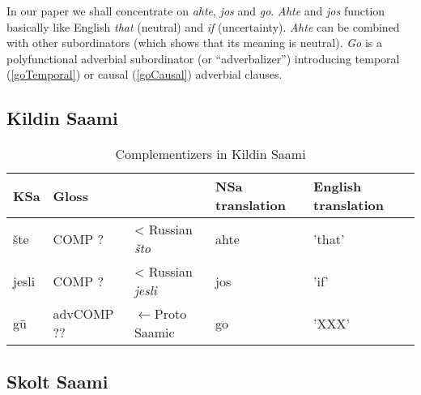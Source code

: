 \documentclass[a4,12pt]{scrartcl}
\begin{document}
In our paper we shall concentrate on {\it ahte}, {\it jos} and {\it go}. {\it Ahte} and  {\it jos}  function basically like English {\it that} (neutral) and {\it if} (uncertainty). {\it Ahte} can be combined with other subordinators (which shows that its meaning is neutral).  
{\it Go} is a polyfunctional adverbial subordinator (or “adverbalizer”) introducing temporal (\ref{goTemporal}) or causal (\ref{goCausal}) adverbial clauses.


\subsection{Kildin Saami}


\begin{table}[!ht]
\begin{tabular}{l | l l l l}
\hline
\hline
KSa 		& Gloss			&					&NSa translation	& English translation\\
\hline
šte		&{\sc COMP} ?		&< Russian {\it što}		&ahte			&'that'\\
jesli		&{\sc	 COMP} ?		&< Russian {\it jesli}		&jos				&'if'\\
gū		&{\sc advCOMP} ??	&$\leftarrow$Proto Saamic&go				& 'XXX'\\
\hline
\hline
\end{tabular}
\label{KildinComps}
\caption{Complementizers in Kildin Saami}
\end{table}


\subsection{Skolt Saami}
\end{document}
